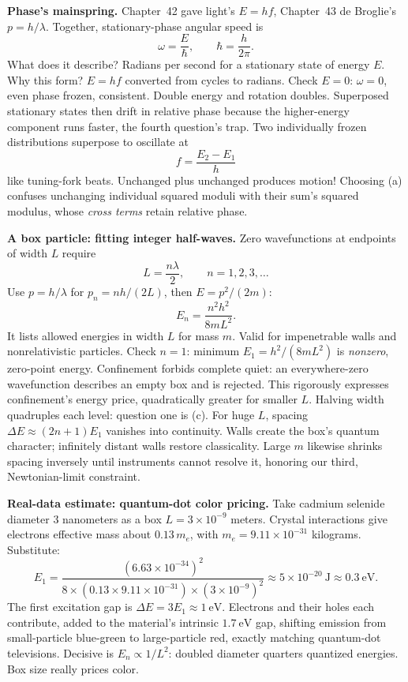\begin{mainline}
\textbf{Phase's mainspring.} Chapter~42 gave light's \(E=hf\), Chapter~43 de Broglie's \(p=h/\lambda\). Together, stationary-phase angular speed is
\[
  \omega=\frac{E}{\hbar},\qquad \hbar=\frac{h}{2\pi}.
\]
What does it describe? Radians per second for a stationary state of energy \(E\). Why this form? \(E=hf\) converted from cycles to radians. Check \(E=0\): \(\omega=0\), even phase frozen, consistent. Double energy and rotation doubles. Superposed stationary states then drift in relative phase because the higher-energy component runs faster, the fourth question's trap. Two individually frozen distributions superpose to oscillate at
\[
  f=\frac{E_{2}-E_{1}}{h}
\]
like tuning-fork beats. Unchanged plus unchanged produces motion! Choosing (a) confuses unchanging individual squared moduli with their sum's squared modulus, whose \emph{cross terms} retain relative phase.

\textbf{A box particle: fitting integer half-waves.} Zero wavefunctions at endpoints of width \(L\) require
\[
  L=\frac{n\lambda}{2},\qquad n=1,2,3,\dots
\]
Use \(p=h/\lambda\) for \(p_{n}=nh/(2L)\), then \(E=p^{2}/(2m)\):
\[
  E_{n}=\frac{n^{2}h^{2}}{8mL^{2}}.
\]
It lists allowed energies in width \(L\) for mass \(m\). Valid for impenetrable walls and nonrelativistic particles. Check \(n=1\): minimum \(E_{1}=h^{2}/(8mL^{2})\) is \emph{nonzero}, zero-point energy. Confinement forbids complete quiet: an everywhere-zero wavefunction describes an empty box and is rejected. This rigorously expresses confinement's energy price, quadratically greater for smaller \(L\). Halving width quadruples each level: question one is (c). For huge \(L\), spacing \(\Delta E\approx(2n+1)E_{1}\) vanishes into continuity. Walls create the box's quantum character; infinitely distant walls restore classicality. Large \(m\) likewise shrinks spacing inversely until instruments cannot resolve it, honoring our third, Newtonian-limit constraint.

\textbf{Real-data estimate: quantum-dot color pricing.} Take cadmium selenide diameter \(3\) nanometers as a box \(L=3\times10^{-9}\) meters. Crystal interactions give electrons effective mass about \(0.13\,m_{e}\), with \(m_{e}=9.11\times10^{-31}\) kilograms. Substitute:
\[
  E_{1}=\frac{(6.63\times10^{-34})^{2}}{8\times(0.13\times9.11\times10^{-31})\times(3\times10^{-9})^{2}}
  \approx5\times10^{-20}\ \text{J}\approx0.3\ \text{eV}.
\]
The first excitation gap is \(\Delta E=3E_{1}\approx1\ \text{eV}\). Electrons and their holes each contribute, added to the material's intrinsic \(1.7\ \text{eV}\) gap, shifting emission from small-particle blue-green to large-particle red, exactly matching quantum-dot televisions. Decisive is \(E_{n}\propto1/L^{2}\): doubled diameter quarters quantized energies. Box size really prices color.


\end{mainline}
